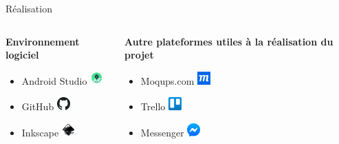 \documentclass[xcolor=dvipsnames]{beamer}
\begin{document}
\begin{frame}{Réalisation}
    \begin{columns}[T]
    \begin{column}[c]{5cm}
        \textbf{\Large{Environnement logiciel}}
        \vspace{2em}
        \begin{itemize}[label=\textbullet]
            \item Android Studio \includegraphics[height=0.5cm]{Images/1200px-Android_Studio_icon.svg.png}
            \item GitHub \includegraphics[height=0.5cm]{Images/1200px-Octicons-mark-github.svg.png}
            \item Inkscape \includegraphics[height=0.5cm]{Images/1200px-Inkscape_Logo.svg.png}
        \end{itemize}
    \end{column}
    \begin{column}[c]{5cm}
        \textbf{\Large{Autre plateformes utiles à la réalisation du projet}}
        \vspace{1em}
        \begin{itemize}[label=\textbullet]
            \item Moqups.com \includegraphics[height=0.5cm]{Images/moqups.png}
            \item Trello \includegraphics[height=0.5cm]{Images/logo_trello.png}
            \item Messenger \includegraphics[height=0.5cm]{Images/1200px-Facebook_Messenger_4_Logo.svg.png}
        \end{itemize}
    \end{column}
    \end{columns}
\end{frame}
\end{document}
